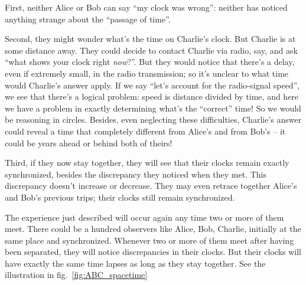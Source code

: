 \documentclass[a4paper,12pt,%
onecolumn,oneside,titlepage,%
british%
]{memoir}
\renewcommand*{\|}[1][]{\nonscript\:#1\vert\nonscript\:\mathopen{}}
\newcommand*{\fig}{fig.}%
\begin{document}
First, neither Alice or Bob can say \enquote{my clock was wrong}: neither has noticed anything strange about the \enquote{passage of time}.

Second, they might wonder what's the time on Charlie's clock. But Charlie is at some distance away. They could decide to contact Charlie via radio, say, and ask \enquote{what shows your clock right \emph{now}?}. But they would notice that there's a delay, even if extremely small, in the radio transmission; so it's unclear to what time would Charlie's answer apply. If we say \enquote{let's account for the radio-signal speed}, we see that there's a logical problem: speed is distance divided by time, and here we have a problem in exactly determining what's the \enquote{correct} time! So we would be reasoning in circles. Besides, even neglecting these difficulties, Charlie's answer could reveal a time that completely different from Alice's and from Bob's -- it could be years ahead or behind both of theirs!

Third, if they now stay together, they will see that their clocks remain exactly synchronized, besides the discrepancy they noticed when they met. This discrepancy doesn't increase or decrease. They may even retrace together Alice's and Bob's previous trips; their clocks still remain synchronized.

The experience just described will occur again any time two or more of them meet. There could be a hundred observers like Alice, Bob, Charlie, initially at the same place and synchronized. Whenever two or more of them meet after having been separated, they will notice discrepancies in their clocks. But their clocks will have exactly the same time lapses as long as they stay together. See the illustration in \fig~\ref{fig:ABC_spacetime}
\end{document}
